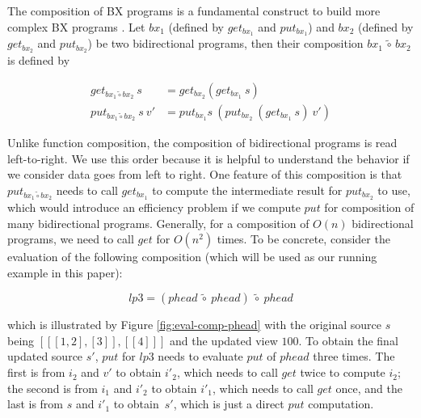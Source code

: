 The composition of BX programs is a fundamental construct to build more complex BX programs \cite{Bohannon06relationallenses:, Bohannon:2008:BRL:1328438.1328487}. Let $bx_1$ (defined by $get_{bx_1}$ and $put_{bx_1}$) and $bx_2$ (defined by $get_{bx_2}$ and $put_{bx_2}$) be two bidirectional programs, then their composition $bx_1 \,\tilde{\circ}\, bx_2$ is defined by

\minusvspace
\begin{align}
get_{bx_1 \tilde{\circ} bx_2}~s &= get_{bx_2} (get_{bx_1}~s)\\
put_{bx_1 \tilde{\circ} bx_2}~s~v' &= put_{bx_1} s~(put_{bx_2}~ (get_{bx_1}~s)~v')
\end{align}
\minusvspace

\noindent
Unlike function composition, the composition of bidirectional programs is read left-to-right. We use this order because it is helpful to understand the behavior if we consider data goes from left to right.
One feature of this composition is that $put_{bx_1 \tilde{\circ} bx_2}$ needs to call $get_{bx_1}$ to compute the intermediate result for $put_{bx_2}$ to use, which would introduce an efficiency problem if we compute $put$ for composition of many bidirectional programs. Generally, for a composition of $O(n)$ bidirectional programs, we need to call $get$ for $O(n^2)$ times. To be concrete, consider the evaluation of the following composition (which will be used as our running example in this paper):

\minusvspacetwo
\[
lp3 = (phead~\tilde{\circ}~phead)~\tilde{\circ}~phead
\]
\minusvspacetwo

\noindent which is illustrated by Figure \ref{fig:eval-comp-phead} with the original source $s$ being ${[[[1,2],[3]],[[4]]]}$ and the updated view ${100}$.
To obtain the final updated source $s'$, $put$ for $lp3$ needs to evaluate $put$ of $phead$ three times. The first is from $i_2$ and $v'$ to obtain $i'_2$, which needs to call $get$ twice to compute $i_2$; the second is from $i_1$ and $i'_2$ to obtain $i'_1$, which needs to call $get$ once, and the last is from $s$ and $i'_1$ to obtain~$s'$, which is just a direct $put$ computation.



